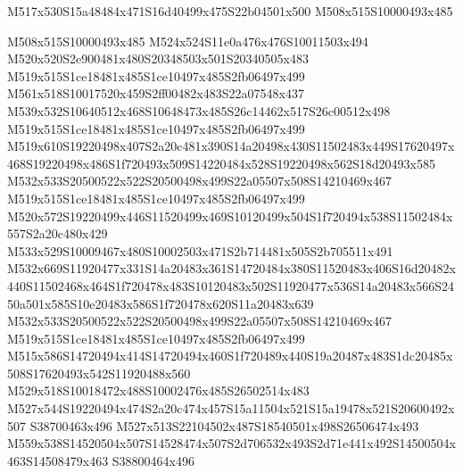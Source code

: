 \documentclass{article}
\begin{document}
\begin{multicols}{2}


\begin{center}
M517x530S15a48484x471S16d40499x475S22b04501x500 M508x515S10000493x485 
\end{center}


M508x515S10000493x485 M524x524S11e0a476x476S10011503x494 M520x520S2e900481x480S20348503x501S20340505x483 M519x515S1ce18481x485S1ce10497x485S2fb06497x499 M561x518S10017520x459S2ff00482x483S22a07548x437 M539x532S10640512x468S10648473x485S26c14462x517S26c00512x498 M519x515S1ce18481x485S1ce10497x485S2fb06497x499 M519x610S19220498x407S2a20c481x390S14a20498x430S11502483x449S17620497x468S19220498x486S1f720493x509S14220484x528S19220498x562S18d20493x585 M532x533S20500522x522S20500498x499S22a05507x508S14210469x467 M519x515S1ce18481x485S1ce10497x485S2fb06497x499 M520x572S19220499x446S11520499x469S10120499x504S1f720494x538S11502484x557S2a20c480x429 M533x529S10009467x480S10002503x471S2b714481x505S2b705511x491 M532x669S11920477x331S14a20483x361S14720484x380S11520483x406S16d20482x440S11502468x464S1f720478x483S10120483x502S11920477x536S14a20483x566S2450a501x585S10e20483x586S1f720478x620S11a20483x639 M532x533S20500522x522S20500498x499S22a05507x508S14210469x467 M519x515S1ce18481x485S1ce10497x485S2fb06497x499 M515x586S14720494x414S14720494x460S1f720489x440S19a20487x483S1dc20485x508S17620493x542S11920488x560 M529x518S10018472x488S10002476x485S26502514x483 M527x544S19220494x474S2a20c474x457S15a11504x521S15a19478x521S20600492x507 S38700463x496 M527x513S22104502x487S18540501x498S26506474x493 M559x538S14520504x507S14528474x507S2d706532x493S2d71e441x492S14500504x463S14508479x463 S38800464x496





\end{multicols}
\end{document}
